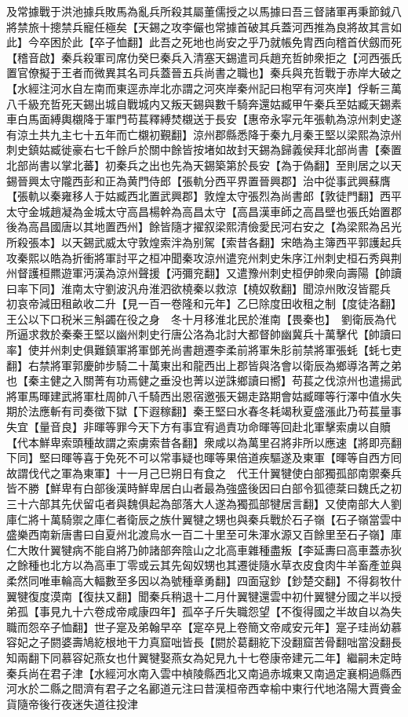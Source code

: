 及常據戰于洪池據兵敗馬為亂兵所殺其屬董儒授之以馬據曰吾三督諸軍再秉節鉞八將禁旅十摠禁兵寵任極矣【天錫之攻李儼也常據首破其兵蓋河西推為良將故其言如此】今卒困於此【卒子恤翻】此吾之死地也尚安之乎乃就帳免胄西向稽首伏劔而死【稽音啟】秦兵殺軍司席仂癸巳秦兵入清塞天錫遣司兵趙充哲帥衆拒之【河西張氏置官僚擬于王者而微異其名司兵蓋晉五兵尚書之職也】秦兵與充哲戰于赤岸大破之【水經注河水自左南而東逕赤岸北亦謂之河夾岸秦州記曰枹罕有河夾岸】俘斬三萬八千級充哲死天錫出城自戰城内又叛天錫與數千騎奔還姑臧甲午秦兵至姑臧天錫素車白馬面縛輿櫬降于軍門苟萇釋縛焚櫬送于長安【惠帝永寜元年張軌為涼州刺史遂有涼土共九主七十五年而亡櫬初覲翻】涼州郡縣悉降于秦九月秦王堅以梁熙為涼州刺史鎮姑臧徙豪右七千餘戶於關中餘皆按堵如故封天錫為歸義侯拜北部尚書【秦置北部尚書以掌北蕃】初秦兵之出也先為天錫築第於長安【為于偽翻】至則居之以天錫晉興太守隴西彭和正為黄門侍郎【張軌分西平界置晉興郡】治中從事武興蘇膺【張軌以秦雍移人于姑臧西北置武興郡】敦煌太守張烈為尚書郎【敦徒門翻】西平太守金城趙凝為金城太守高昌楊幹為高昌太守【高昌漢車師之高昌壁也張氏始置郡後為高昌國唐以其地置西州】餘皆隨才擢叙梁熙清儉愛民河右安之【為梁熙為呂光所殺張本】以天錫武威太守敦煌索泮為别駕【索昔各翻】宋皓為主簿西平郭護起兵攻秦熙以皓為折衝將軍討平之桓冲聞秦攻涼州遣兖州刺史朱序江州刺史桓石秀與荆州督護桓羆遊軍沔漢為涼州聲援【沔彌兖翻】又遣豫州刺史桓伊帥衆向壽陽【帥讀曰率下同】淮南太守劉波汎舟淮泗欲橈秦以救涼【橈奴敎翻】聞涼州敗沒皆罷兵　初哀帝減田租畝收二升【見一百一卷隆和元年】乙巳除度田收租之制【度徒洛翻】王公以下口税米三斛蠲在役之身　冬十月移淮北民於淮南【畏秦也】　劉衛辰為代所逼求救於秦秦王堅以幽州刺史行唐公洛為北討大都督帥幽冀兵十萬擊代【帥讀曰率】使并州刺史俱難鎮軍將軍鄧羌尚書趙遷李柔前將軍朱肜前禁將軍張蚝【蚝七吏翻】右禁將軍郭慶帥步騎二十萬東出和龍西出上郡皆與洛會以衛辰為鄉導洛菁之弟也【秦主健之入關菁有功焉健之垂没也菁以逆誅鄉讀曰嚮】苟萇之伐涼州也遣揚武將軍馬暉建武將軍杜周帥八千騎西出恩宿邀張天錫走路期會姑臧暉等行澤中值水失期於法應斬有司奏徵下獄【下遐稼翻】秦王堅曰水春冬耗竭秋夏盛漲此乃苟萇量事失宜【量音良】非暉等罪今天下方有事宜宥過責功命暉等回赴北軍擊索虜以自贖【代本鮮卑索頭種故謂之索虜索昔各翻】衆咸以為萬里召將非所以應速【將即亮翻下同】堅曰暉等喜于免死不可以常事疑也暉等果倍道疾驅遂及東軍【暉等自西方囘故謂伐代之軍為東軍】十一月己巳朔日有食之　代王什翼犍使白部獨孤部南禦秦兵皆不勝【鮮卑有白部後漢時鮮卑居白山者最為強盛後因曰白部令狐德棻曰魏氏之初三十六部其先伏留屯者與魏俱起為部落大人遂為獨孤部犍居言翻】又使南部大人劉庫仁將十萬騎禦之庫仁者衛辰之族什翼犍之甥也與秦兵戰於石子嶺【石子嶺當雲中盛樂西南新唐書曰自夏州北渡烏水一百二十里至可朱渾水源又百餘里至石子嶺】庫仁大敗什翼犍病不能自將乃帥諸部奔陰山之北高車雜種盡叛【李延夀曰高車蓋赤狄之餘種也北方以為高車丁零或云其先匈奴甥也其遷徙隨水草衣皮食肉牛羊畜產並與柔然同唯車輪高大輻數至多因以為號種章勇翻】四面寇鈔【鈔楚交翻】不得芻牧什翼犍復度漠南【復扶又翻】聞秦兵稍退十二月什翼犍還雲中初什翼犍分國之半以授弟孤【事見九十六卷成帝咸康四年】孤卒子斤失職怨望【不復得國之半故自以為失職而怨卒子恤翻】世子寔及弟翰早卒【寔卒見上卷簡文帝咸安元年】寔子珪尚幼慕容妃之子閼婆壽鳩紇根地干力真窟咄皆長【閼於葛翻紇下没翻窟苦骨翻咄當没翻長知兩翻下同慕容妃燕女也什翼犍娶燕女為妃見九十七卷康帝建元二年】繼嗣未定時秦兵尚在君子津【水經河水南入雲中楨陵縣西北又南過赤城東又南過定襄桐過縣西河水於二縣之間濟有君子之名酈道元注曰昔漢桓帝西幸榆中東行代地洛陽大賈賫金貨隨帝後行夜迷失道往投津